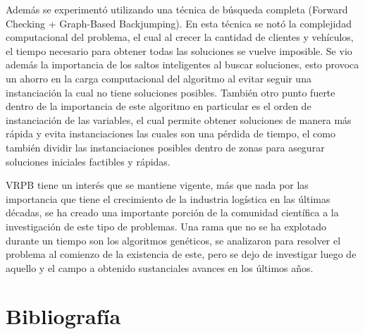 \documentclass[letter, 10pt]{article}
\begin{document}
Además se experimentó utilizando una técnica de búsqueda completa (Forward Checking + Graph-Based Backjumping). En esta técnica se notó la complejidad computacional del problema, el cual al crecer la cantidad de clientes y vehículos, el tiempo necesario para obtener todas las soluciones se vuelve imposible. Se vio además la importancia de los saltos inteligentes al buscar soluciones, esto provoca un ahorro en la carga computacional del algoritmo al evitar seguir una instanciación la cual no tiene soluciones posibles. También otro punto fuerte dentro de la importancia de este algoritmo en particular es el orden de instanciación de las variables, el cual permite obtener soluciones de manera más rápida y evita instanciaciones las cuales son una pérdida de tiempo, el como también dividir las instanciaciones posibles dentro de zonas para asegurar soluciones iniciales factibles y rápidas.

VRPB tiene un interés que se mantiene vigente, más que nada por las importancia que tiene el crecimiento de la industria logística en las últimas décadas, se ha creado una importante porción de la comunidad científica a la investigación de este tipo de problemas. Una rama que no se ha explotado durante un tiempo son los algoritmos genéticos, se analizaron para resolver el problema al comienzo de la existencia de este, pero se dejo de investigar luego de aquello y el campo a obtenido sustanciales avances en los últimos años.

\newpage

\section{Bibliografía}


\end{document}
